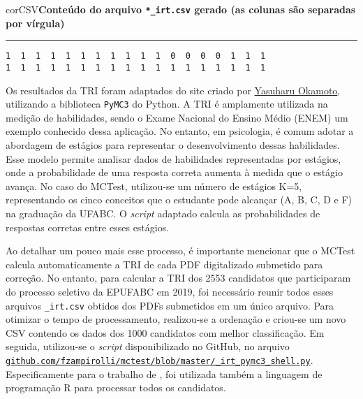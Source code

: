 \begin{myboxCode}{corCSV}{\textbf{Conteúdo do arquivo \texttt{*\_irt.csv} gerado (as colunas são separadas por vírgula)}}\vspace{3mm}
\hrule
{\footnotesize
\begin{verbatim}
1  1  1  1  1  1  1  1  1  1  1  0  0  0  0  1  1  1
1  1  1  1  1  1  1  1  1  1  1  1  1  1  1  1  1  1
\end{verbatim}
}
\end{myboxCode}

Os resultados da TRI foram adaptados do site criado por \href{http://y-okamoto-psy1949.la.coocan.jp/Python/en1/IRTLClassPyMC3/}{Yasuharu Okamoto}, utilizando a biblioteca \verb|PyMC3| do Python. A TRI é amplamente utilizada na medição de habilidades, sendo o Exame Nacional do Ensino Médio (ENEM) um exemplo conhecido dessa aplicação. No entanto, em psicologia, é comum adotar a abordagem de estágios para representar o desenvolvimento dessas habilidades. Esse modelo permite analisar dados de habilidades representadas por estágios, onde a probabilidade de uma resposta correta aumenta à medida que o estágio avança. No caso do MCTest, utilizou-se um número de estágios K=5, representando os cinco conceitos que o estudante pode alcançar (A, B, C, D e F) na graduação da UFABC. O \textit{script} adaptado calcula as probabilidades de respostas corretas entre esses estágios.

Ao detalhar um pouco mais esse processo, é importante mencionar que o MCTest calcula automaticamente a TRI de cada PDF digitalizado submetido para correção. No entanto, para calcular a TRI dos 2553 candidatos que participaram do processo seletivo da EPUFABC em 2019, foi necessário reunir todos esses arquivos \verb|_irt.csv| obtidos dos PDFs submetidos em um único arquivo. Para otimizar o tempo de processamento, realizou-se a ordenação e criou-se um novo CSV contendo os dados dos 1000 candidatos com melhor classificação. Em seguida, utilizou-se o \textit{script} disponibilizado no GitHub, no arquivo \href{https://github.com/fzampirolli/mctest/blob/master/_irt_pymc3_shell.py}{\texttt{github.com/fzampirolli/mctest/blob/master/\_irt\_pymc3\_shell.py}}. Especificamente para o trabalho de , foi utilizada também a linguagem de programação R para processar todos os candidatos.




